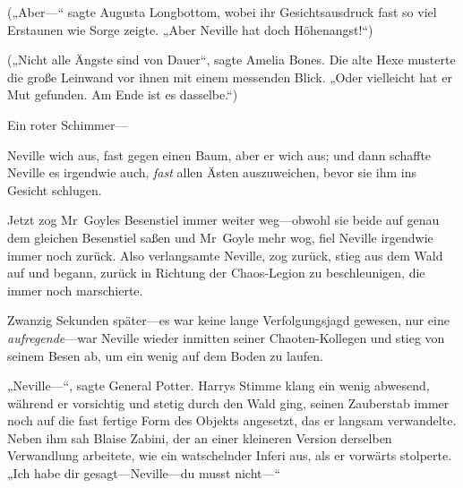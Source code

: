 („Aber—“ sagte Augusta Longbottom, wobei ihr Gesichtsausdruck fast so viel Erstaunen wie Sorge zeigte. „Aber Neville hat doch Höhenangst!“)

(„Nicht alle Ängste sind von Dauer“, sagte Amelia Bones. Die alte Hexe musterte die große Leinwand vor ihnen mit einem messenden Blick. „Oder vielleicht hat er Mut gefunden. Am Ende ist es dasselbe.“)

Ein roter Schimmer—

Neville wich aus, fast gegen einen Baum, aber er wich aus; und dann schaffte Neville es irgendwie auch, \emph{fast} allen Ästen auszuweichen, bevor sie ihm ins Gesicht schlugen.

Jetzt zog Mr~Goyles Besenstiel immer weiter weg—obwohl sie beide auf genau dem gleichen Besenstiel saßen und Mr~Goyle mehr wog, fiel Neville irgendwie immer noch zurück. Also verlangsamte Neville, zog zurück, stieg aus dem Wald auf und begann, zurück in Richtung der Chaos-Legion zu beschleunigen, die immer noch marschierte.

Zwanzig Sekunden später—es war keine lange Verfolgungsjagd gewesen, nur eine \emph{aufregende}—war Neville wieder inmitten seiner Chaoten-Kollegen und stieg von seinem Besen ab, um ein wenig auf dem Boden zu laufen.

„Neville—“, sagte General Potter. Harrys Stimme klang ein wenig abwesend, während er vorsichtig und stetig durch den Wald ging, seinen Zauberstab immer noch auf die fast fertige Form des Objekts angesetzt, das er langsam verwandelte. Neben ihm sah Blaise Zabini, der an einer kleineren Version derselben Verwandlung arbeitete, wie ein watschelnder Inferi aus, als er vorwärts stolperte. „Ich habe dir gesagt—Neville—du musst nicht—“

